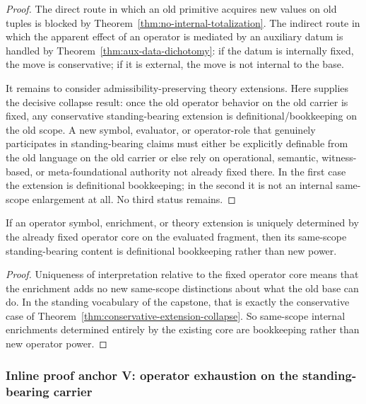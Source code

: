 \begin{proof}
The direct route in which an old primitive acquires new values on old tuples is blocked by Theorem~\ref{thm:no-internal-totalization}. The indirect route in which the apparent effect of an operator is mediated by an auxiliary datum is handled by Theorem~\ref{thm:aux-data-dichotomy}: if the datum is internally fixed, the move is conservative; if it is external, the move is not internal to the base.

It remains to consider admissibility-preserving theory extensions. Here \clausuradoc{} supplies the decisive collapse result: once the old operator behavior on the old carrier is fixed, any conservative standing-bearing extension is definitional/bookkeeping on the old scope. A new symbol, evaluator, or operator-role that genuinely participates in standing-bearing claims must either be explicitly definable from the old language on the old carrier or else rely on operational, semantic, witness-based, or meta-foundational authority not already fixed there. In the first case the extension is definitional bookkeeping; in the second it is not an internal same-scope enlargement at all. No third status remains.
\end{proof}

\begin{corollary}
If an operator symbol, enrichment, or theory extension is uniquely determined by the already fixed operator core on the evaluated fragment, then its same-scope standing-bearing content is definitional bookkeeping rather than new power.
\end{corollary}

\begin{proof}
Uniqueness of interpretation relative to the fixed operator core means that the enrichment adds no new same-scope distinctions about what the old base can do. In the standing vocabulary of the capstone, that is exactly the conservative case of Theorem~\ref{thm:conservative-extension-collapse}. So same-scope internal enrichments determined entirely by the existing core are bookkeeping rather than new operator power.
\end{proof}

\subsubsection*{Inline proof anchor V: operator exhaustion on the standing-bearing carrier}

